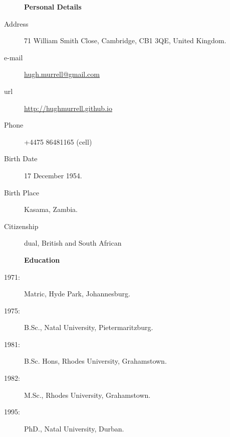 \documentclass[12pt]{article}
\begin{document}
\begin{multicols}{2}
\begin{description}\item[] \begin{description}\item[] {\large \bf   Personal Details  }
\item[Address]  71 William Smith Close, Cambridge, CB1 3QE, United Kingdom.
\item[e-mail]  \url{hugh.murrell@gmail.com}
\item[url]  \url{http://hughmurrell.github.io}
\item[Phone]  +4475 86481165 (cell) 
\item[Birth Date]  17 December 1954.
\item[Birth Place]  Kasama, Zambia.
\item[Citizenship]  dual, British and South African
\end{description}
\end{description}

\begin{description}\item[] \begin{description}\item[] {\large \bf   Education  }    
\item[1971:] Matric, Hyde Park, Johannesburg.
  \item[1975:]  B.Sc., Natal University, Pietermaritzburg. 
  \item[1981:]  B.Sc. Hons, Rhodes University, Grahamstown. 
  \item[1982: ] M.Sc., Rhodes University, Grahamstown. 
  \item[1995: ] PhD., Natal University, Durban. 
 \end{description}
 \end{description}
 



\end{multicols}
\end{document}
